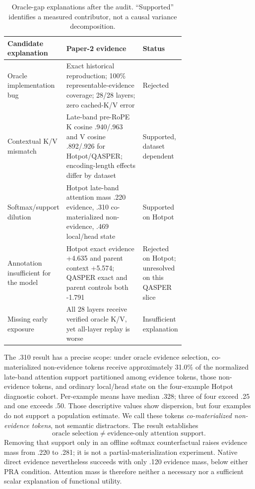 \documentclass[11pt]{article}
\begin{document}
\begin{table}[H]
\centering
\footnotesize
\caption{Oracle-gap explanations after the audit.  ``Supported'' identifies a measured
contributor, not a causal variance decomposition.}
\label{tab:oracle-gap-decomposition}
\begin{tabularx}{\linewidth}{L{0.27\linewidth}L{0.44\linewidth}Y}
\toprule
Candidate explanation & Paper-2 evidence & Status \\
\midrule
Oracle implementation bug & Exact historical reproduction; 100\% representable-evidence coverage; 28/28 layers; zero cached-K/V error & Rejected \\
Contextual K/V mismatch & Late-band pre-RoPE K cosine .940/.963 and V cosine .892/.926 for Hotpot/QASPER; encoding-length effects differ by dataset & Supported, dataset dependent \\
Softmax/support dilution & Hotpot late-band attention mass .220 evidence, .310 co-materialized non-evidence, .469 local/head state & Supported on Hotpot \\
Annotation insufficient for the model & Hotpot exact evidence +4.635 and parent context +5.574; QASPER exact and parent controls both -1.791 & Rejected on Hotpot; unresolved on this QASPER slice \\
Missing early exposure & All 28 layers receive verified oracle K/V, yet all-layer replay is worse & Insufficient explanation \\
\bottomrule
\end{tabularx}
\end{table}

The .310 result has a precise scope: under oracle evidence selection, co-materialized non-evidence
tokens receive approximately 31.0\% of the normalized late-band attention support partitioned
among evidence tokens, those non-evidence tokens, and ordinary local/head state on the four-example
Hotpot diagnostic cohort. Per-example means have median .328; three of four
exceed .25 and one exceeds .50.  Those descriptive values show dispersion, but four examples do
not support a population estimate.  We call these tokens \emph{co-materialized non-evidence
tokens}, not semantic distractors.  The result establishes
\begin{equation}
\text{oracle selection}\neq\text{evidence-only attention support}.
\end{equation}
Removing that support only in an offline softmax counterfactual raises evidence mass from .220 to
.281; it is not a partial-materialization experiment. Native direct evidence nevertheless succeeds
with only .120 evidence mass, below either PRA condition. Attention mass is therefore neither a
necessary nor a sufficient scalar explanation of functional utility.
\end{document}
